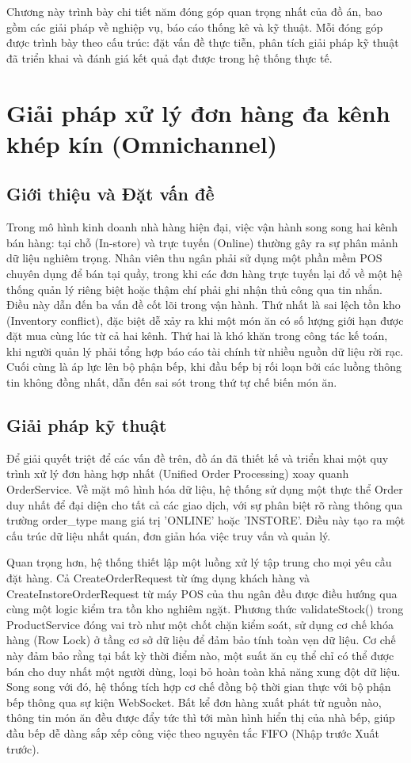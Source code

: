 \documentclass[../20232006p.tex]{subfiles}
\begin{document}
Chương này trình bày chi tiết năm đóng góp quan trọng nhất của đồ án, bao gồm các giải pháp về nghiệp vụ, báo cáo thống kê và kỹ thuật. Mỗi đóng góp được trình bày theo cấu trúc: đặt vấn đề thực tiễn, phân tích giải pháp kỹ thuật đã triển khai và đánh giá kết quả đạt được trong hệ thống thực tế.

\section{Giải pháp xử lý đơn hàng đa kênh khép kín (Omnichannel)}

\subsection{Giới thiệu và Đặt vấn đề}
Trong mô hình kinh doanh nhà hàng hiện đại, việc vận hành song song hai kênh bán hàng: tại chỗ (In-store) và trực tuyến (Online) thường gây ra sự phân mảnh dữ liệu nghiêm trọng. Nhân viên thu ngân phải sử dụng một phần mềm POS chuyên dụng để bán tại quầy, trong khi các đơn hàng trực tuyến lại đổ về một hệ thống quản lý riêng biệt hoặc thậm chí phải ghi nhận thủ công qua tin nhắn. Điều này dẫn đến ba vấn đề cốt lõi trong vận hành. Thứ nhất là sai lệch tồn kho (Inventory conflict), đặc biệt dễ xảy ra khi một món ăn có số lượng giới hạn được đặt mua cùng lúc từ cả hai kênh. Thứ hai là khó khăn trong công tác kế toán, khi người quản lý phải tổng hợp báo cáo tài chính từ nhiều nguồn dữ liệu rời rạc. Cuối cùng là áp lực lên bộ phận bếp, khi đầu bếp bị rối loạn bởi các luồng thông tin không đồng nhất, dẫn đến sai sót trong thứ tự chế biến món ăn.

\subsection{Giải pháp kỹ thuật}
Để giải quyết triệt để các vấn đề trên, đồ án đã thiết kế và triển khai một quy trình xử lý đơn hàng hợp nhất (Unified Order Processing) xoay quanh OrderService. Về mặt mô hình hóa dữ liệu, hệ thống sử dụng một thực thể Order duy nhất để đại diện cho tất cả các giao dịch, với sự phân biệt rõ ràng thông qua trường order\_type mang giá trị 'ONLINE' hoặc 'INSTORE'. Điều này tạo ra một cấu trúc dữ liệu nhất quán, đơn giản hóa việc truy vấn và quản lý.

Quan trọng hơn, hệ thống thiết lập một luồng xử lý tập trung cho mọi yêu cầu đặt hàng. Cả CreateOrderRequest từ ứng dụng khách hàng và CreateInstoreOrderRequest từ máy POS của thu ngân đều được điều hướng qua cùng một logic kiểm tra tồn kho nghiêm ngặt. Phương thức validateStock() trong ProductService đóng vai trò như một chốt chặn kiểm soát, sử dụng cơ chế khóa hàng (Row Lock) ở tầng cơ sở dữ liệu để đảm bảo tính toàn vẹn dữ liệu. Cơ chế này đảm bảo rằng tại bất kỳ thời điểm nào, một suất ăn cụ thể chỉ có thể được bán cho duy nhất một người dùng, loại bỏ hoàn toàn khả năng xung đột dữ liệu. Song song với đó, hệ thống tích hợp cơ chế đồng bộ thời gian thực với bộ phận bếp thông qua sự kiện WebSocket. Bất kể đơn hàng xuất phát từ nguồn nào, thông tin món ăn đều được đẩy tức thì tới màn hình hiển thị của nhà bếp, giúp đầu bếp dễ dàng sắp xếp công việc theo nguyên tắc FIFO (Nhập trước Xuất trước).
\end{document}
